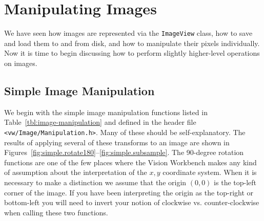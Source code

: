 \section{Manipulating Images}

We have seen how images are represented via the \verb#ImageView#
class, how to save and load them to and from disk, and how to
manipulate their pixels individually.  Now it is time to begin
discussing how to perform slightly higher-level operations on images.

\subsection{Simple Image Manipulation}
\label{sec:simple-image-manipulation}

We begin with the simple image manipulation functions listed in
Table~\ref{tbl:image-manipulation} and defined in the header file
\verb#<vw/Image/Manipulation.h>#.  Many of these should be
self-explanatory.  The results of applying several of these transforms
to an image are shown in
Figures~\ref{fig:simple.rotate180}--\ref{fig:simple.subsample}.  The
90-degree rotation functions are one of the few places where the
Vision Workbench makes any kind of assumption about the interpretation
of the $x,y$ coordinate system.  When it is necessary to make a
distinction we assume that the origin $(0,0)$ is the top-left corner
of the image.  If you have been interpreting the origin as the
top-right or bottom-left you will need to invert your notion of
clockwise vs. counter-clockwise when calling these two functions.

